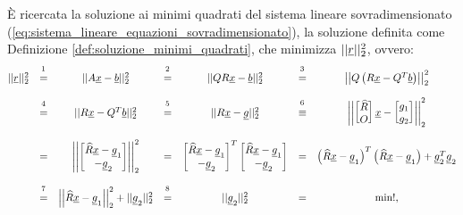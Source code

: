 È ricercata la soluzione ai minimi quadrati del sistema lineare sovradimensionato (\ref{eq:sistema_lineare_equazioni_sovradimensionato}), la soluzione definita come Definizione \ref{def:soluzione_minimi_quadrati}, che minimizza $ ||\uline r||_2^2$, ovvero:
\begin{equation}\label{eq:norma_2_residuo_minimo}
    \begin{matrix}
        ||\uline r||_2^2 &\overset{\footnotemark}{=}& ||A\uline x-\uline b||_2^2 &\overset{\footnotemark}{=}&||QR\uline x-\uline b||_2^2 &\overset{\footnotemark}{=}& \left|\left|Q\left(R\uline x-Q^T\uline b\right)\right|\right|_2^2\\\\
        &\overset{\footnotemark}{=}& ||R\uline x-Q^T\uline b||_2^2 &\overset{\footnotemark}{=}& ||R\uline x - \uline g||_2^2 &\overset{\footnotemark}{\equiv}& 
        \left|\left|\begin{bmatrix}
            \widehat R\\
            O
        \end{bmatrix}\uline x - 
        \begin{bmatrix}
            g_1\\
            g_2
        \end{bmatrix}\right|\right|_2^2\\\\
        &=& \left|\left|\begin{bmatrix}
            \widehat R\uline x-\uline g_1\\
            -\uline g_2
        \end{bmatrix}\right|\right|_2^2 &=&
        \begin{bmatrix}
            \widehat R\uline x-\uline g_1\\
            -\uline g_2
        \end{bmatrix}^T
        \begin{bmatrix}
            \widehat R\uline x-\uline g_1\\
            -\uline g_2
        \end{bmatrix}&=& \left(\widehat R\uline x-\uline g_1\right)^T\left(\widehat R\uline x-\uline g_1\right)+\uline g_2^T\uline g_2 \\\\
        &\overset{\footnotemark}{=}& \left|\left|\widehat R\uline x - \uline g_1\right|\right|_2^2+||\uline g_2||_2^2 &\overset{\footnotemark}{=}& ||\uline g_2||_2^2&=&\min !,
    \end{matrix}
\end{equation}

